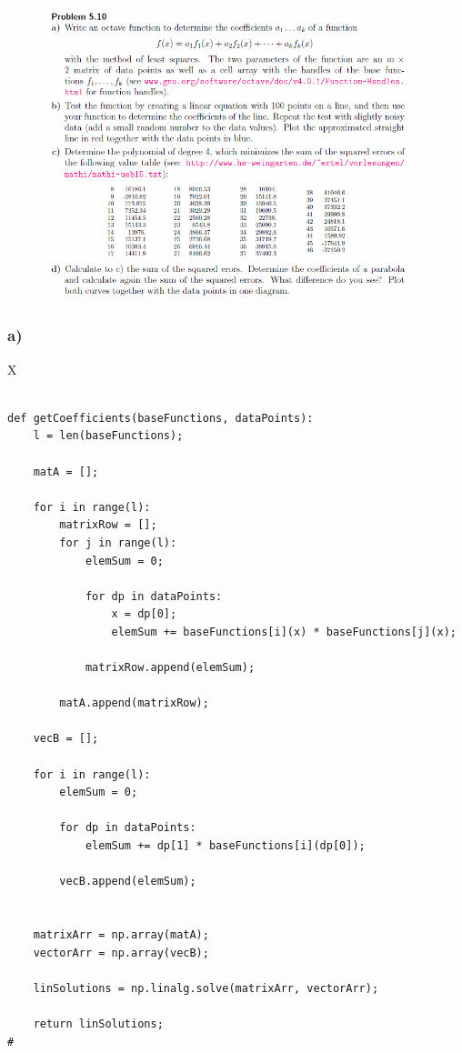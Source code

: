 \begin{figure}[!ht]
\includegraphics[width=1\textwidth]{chapters/images/desc-5-10}
\end{figure}




\subsubsection{a)}

X

\begin{lstlisting}[caption=todo]

def getCoefficients(baseFunctions, dataPoints):
	l = len(baseFunctions);
	
	matA = [];
	
	for i in range(l):
		matrixRow = [];
		for j in range(l):
			elemSum = 0;
		
			for dp in dataPoints:
				x = dp[0];
				elemSum += baseFunctions[i](x) * baseFunctions[j](x);
			
			matrixRow.append(elemSum);
		
		matA.append(matrixRow);
	
	vecB = [];
	
	for i in range(l):
		elemSum = 0;
	
		for dp in dataPoints:
			elemSum += dp[1] * baseFunctions[i](dp[0]);
		
		vecB.append(elemSum);
	
	
	matrixArr = np.array(matA);
	vectorArr = np.array(vecB);
	
	linSolutions = np.linalg.solve(matrixArr, vectorArr);
	
	return linSolutions;
#

\end{lstlisting}



